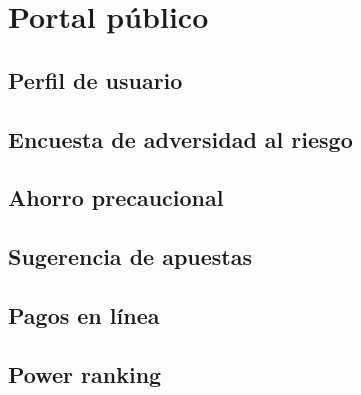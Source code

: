 \chapter{Portal público}
\section{Perfil de usuario}
\section{Encuesta de adversidad al riesgo}
\section{Ahorro precaucional}
\section{Sugerencia de apuestas}
\section{Pagos en línea}
\section{Power ranking}


